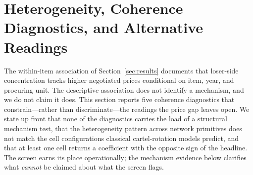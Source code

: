 
\section{Heterogeneity, Coherence Diagnostics, and Alternative Readings}
\label{sec:mechanisms}

The within-item association of Section~\ref{sec:results}
documents that loser-side concentration tracks higher
negotiated prices conditional on item, year, and procuring
unit. The descriptive association does not identify a
mechanism, and we do not claim it does. This section reports
five coherence diagnostics that constrain---rather than
discriminate---the readings the price gap leaves open. We
state up front that none of the diagnostics carries the load
of a structural mechanism test, that the heterogeneity pattern
across network primitives does not match the cell
configurations classical cartel-rotation models predict, and
that at least one cell returns a coefficient with the opposite
sign of the headline. The screen earns its place
operationally; the mechanism evidence below clarifies what
\emph{cannot} be claimed about what the screen flags.

